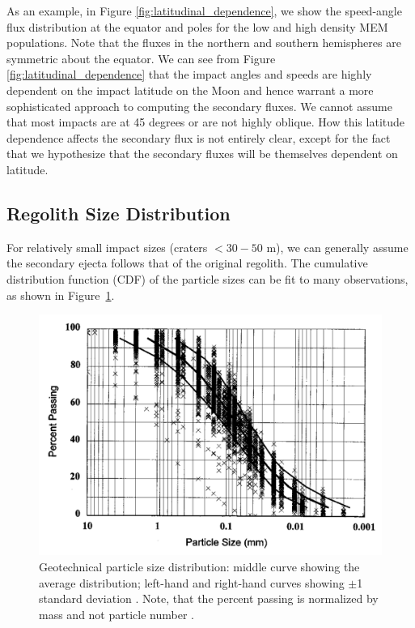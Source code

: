 \documentclass{hitec}
\numberwithin{equation}{section}
\begin{document}
As an example, in Figure \ref{fig:latitudinal_dependence}, we show the speed-angle flux distribution at the equator and poles for the low and high density MEM populations. Note that the fluxes in the northern and southern hemispheres are symmetric about the equator. We can see from Figure \ref{fig:latitudinal_dependence} that the impact angles and speeds are highly dependent on the impact latitude on the Moon and hence warrant a more sophisticated approach to computing the secondary fluxes. We cannot assume that most impacts are at 45 degrees or are not highly oblique. How this latitude dependence affects the secondary flux is not entirely clear, except for the fact that we hypothesize that the secondary fluxes will be themselves dependent on latitude.

\subsection{Regolith Size Distribution}
For relatively small impact sizes (craters $<30-50$ m), we can generally assume the secondary ejecta follows that of the original regolith. The cumulative distribution function (CDF) of the particle sizes can be fit to many observations, as shown in Figure~\ref{fig:Carrier2003_Fig1_particle-size-distribution}.

\begin{figure}[h!]
	\centering
	\includegraphics[scale=0.4]{Carrier2003_Fig1_particle-size-distribution.PNG}
	\caption{Geotechnical particle size distribution: middle curve showing the average distribution; left-hand and right-hand curves showing $\pm$1 standard deviation \citep{carrier2003particle}. Note, that the percent passing is normalized by mass and not particle number \citep[see][]{carrier1973lunar}.}\label{fig:Carrier2003_Fig1_particle-size-distribution}
\end{figure}
\end{document}
